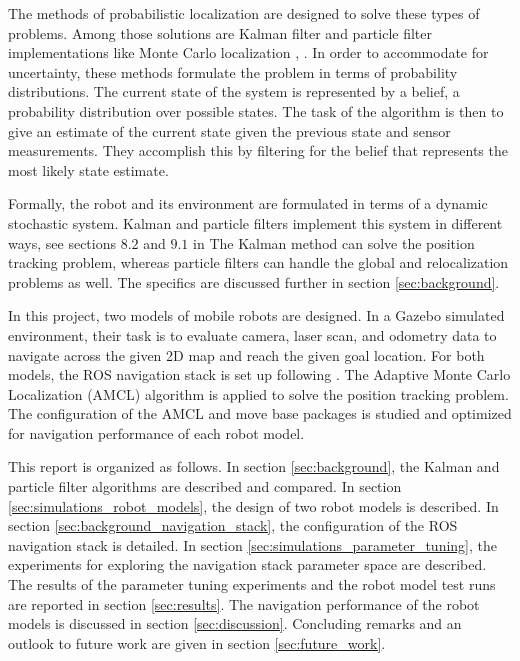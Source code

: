 \documentclass[10pt,journal,compsoc]{IEEEtran}
\begin{document}
The methods of probabilistic localization are designed to solve these types of problems. Among those solutions are Kalman filter and particle filter implementations like Monte Carlo localization \cite{principles_of_robot_motion}, \cite{probabilistic_robotics}. In order to accommodate for uncertainty, these methods formulate the problem in terms of probability distributions. The current state of the system is represented by a belief, a probability distribution over possible states. The task of the algorithm is then to give an estimate of the current state given the previous state and sensor measurements. They accomplish this by filtering for the belief that represents the most likely state estimate.

Formally, the robot and its environment are formulated in terms of a dynamic stochastic system. Kalman and particle filters implement this system in different ways, see sections $8.2$ and $9.1$ in \cite{principles_of_robot_motion} The Kalman method can solve the position tracking problem, whereas particle filters can handle the global and relocalization problems as well. The specifics are discussed further in section \ref{sec:background}. 

In this project, two models of mobile robots are designed. In a Gazebo simulated environment, their task is to evaluate camera, laser scan, and odometry data to navigate across the given 2D map and reach the given goal location. For both models, the ROS navigation stack is set up following \cite{ros_wiki_nav_stack}. The Adaptive Monte Carlo Localization (AMCL) algorithm is applied to solve the position tracking problem. The configuration of the AMCL and move base packages is studied and optimized for navigation performance of each robot model. 

This report is organized as follows. In section \ref{sec:background}, the Kalman and particle filter algorithms are described and compared. In section \ref{sec:simulations_robot_models}, the design of two robot models is described. In section \ref{sec:background_navigation_stack}, the configuration of the ROS navigation stack is detailed. In section \ref{sec:simulations_parameter_tuning}, the experiments for exploring the navigation stack parameter space are described. The results of the parameter tuning experiments and the robot model test runs are reported in section \ref{sec:results}. The navigation performance of the robot models is discussed in section \ref{sec:discussion}. Concluding remarks and an outlook to future work are given in section \ref{sec:future_work}. 
\end{document}

